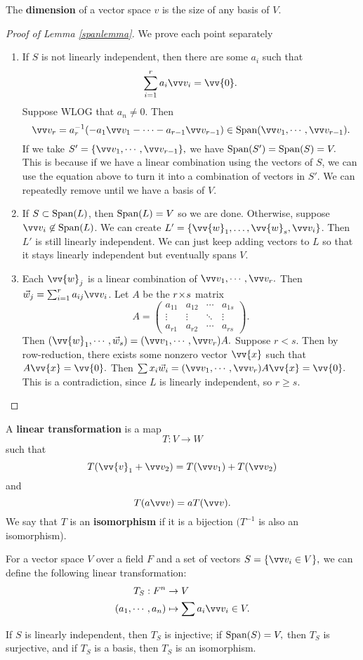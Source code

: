 \begin{definition}
The \textbf{dimension} of a vector space $v$ is the size of any basis of $V.$
\end{definition}

\begin{proof}[Proof of Lemma \ref{spanlemma}]

We prove each point separately
\begin{enumerate}
    \item If $S$ is not linearly independent, then there are some $a_i$ such that 
    \[
    \sum_{i=1}^r a_i \vvv_i = \vv{0}.
    \]
    Suppose WLOG that $a_n \neq 0.$ Then \[\vvv_r = a_r^{-1}(-a_1\vvv_1 - \cdots - a_{r-1}\vvv_{r-1}) \in \spann(\vvv_1, \cdots, \vvv_{r-1}).\] If we take $S' = \{\vvv_1, \cdots, \vvv_{r-1}\},$ we have $\text{Span}(S') = \text{Span}(S) = V.$ This is because if we have a linear combination using the vectors of $S$, we can use the equation above to turn it into a combination of vectors in $S'$. We can repeatedly remove until we have a basis of $V.$
    
    \item
    If $S \subset \text{Span}(L)$, then $\text{Span}(L) = V$ so we are done. 
    Otherwise, suppose $\vvv_i \not \in \spann(L)$. We can create $L' = \{\vv{w}_1, \ldots, \vv{w}_s, \vvv_i\}$. 
    Then $L'$ is still linearly independent. 
    We can just keep adding vectors to $L$ so that it stays linearly independent but eventually spans $V.$
    
    \item Each $\vv{w}_j$ is a linear combination of $\vvv_1 , \cdots, \vvv_r.$ Then $\vec{w}_j = \sum_{i = 1}^{r}  a_{ij} \vvv_i$. Let $A$ be the $r \hspace{0.05em}{\times}\hspace{0.05em} s $ matrix 
    \[
    A = 
    \begin{pmatrix}
    a_{11} & a_{12} & \cdots & a_{1s}\\
    \vdots & \vdots & \ddots & \vdots \\
    a_{r1} & a_{r2} & \cdots & a_{rs}
    \end{pmatrix}.
    \]
    Then $(\vv{w}_1, \cdots, \vec{w}_s) = (\vvv_1, \cdots, \vvv_r)A.$ Suppose $r < s.$ Then by row-reduction, there exists some nonzero vector $\vv{x}$ such that $A \vv{x} = \vv{0}.$ Then $\sum x_i \vec{w}_i = (\vvv_1, \cdots, \vvv_r)A\vv{x} = \vv{0}.$ This is a contradiction, since $L$ is linearly independent, so $r \geq s.$
\end{enumerate}
\end{proof}

\begin{definition}
A \textbf{linear transformation} is a map 
\[
T: V \rightarrow W
\]
such that 
\[
T(\vv{v}_1 + \vvv_2) = T(\vvv_1) + T(\vvv_2) 
\]
and 
\[
T(a\vvv) = aT(\vvv).
\] We say that $T$ is an \textbf{isomorphism} if it is a bijection $(T^{-1}$ is also an isomorphism). 
\end{definition}
For a vector space $V$ over a field $F$ and a set of vectors $S = \{\vvv_i \in V\},$ we can define the following linear transformation:
\begin{align*}
T_S: F^n &\rightarrow V \\
(a_1, \cdots, a_n) &\mapsto \sum a_i \vvv_i \in V.
\end{align*}

If $S$ is linearly independent, then $T_S$ is injective; if $\text{Span}(S) = V,$ then $T_S$ is surjective, and if $T_S$ is a basis, then $T_S$ is an isomorphism.

\newpage